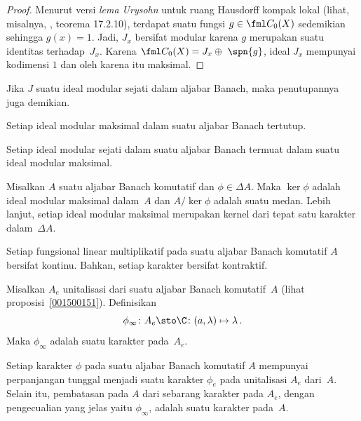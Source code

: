 \begin{proof} Menurut versi \emph{lema Urysohn} untuk ruang Hausdorff kompak lokal
(lihat, misalnya, \cite{Erdman:2007}, teorema 17.2.10), terdapat suatu fungsi $g \in
\fml C_0(X)$ sedemikian sehingga $g(x) = 1$. Jadi, $J_x$ bersifat modular karena $g$
merupakan suatu identitas terhadap~$J_x$. Karena $\fml C_0(X) = J_x \oplus\,\, \spn\{g\}$,
ideal $J_x$ mempunyai kodimensi $1$ dan oleh karena itu maksimal.
\end{proof}

\begin{prop} Jika $J$ suatu ideal modular sejati dalam aljabar Banach, maka penutupannya
juga demikian.
\end{prop}

\begin{cor} Setiap ideal modular maksimal dalam suatu aljabar Banach tertutup.
\end{cor}

\begin{prop} Setiap ideal modular sejati dalam suatu aljabar Banach termuat dalam suatu
ideal modular maksimal.
\end{prop}

\begin{prop}\label{00150144} Misalkan $A$ suatu aljabar Banach komutatif dan $\phi \in
\Delta A$. Maka $\ker\phi$ adalah ideal modular maksimal dalam~$A$ dan $A/\ker\phi$ adalah
suatu medan. Lebih lanjut, setiap ideal modular maksimal merupakan kernel dari tepat satu
karakter dalam~$\Delta A$.
\end{prop}

\begin{prop}\label{00150147} Setiap fungsional linear multiplikatif pada suatu aljabar
Banach komutatif $A$ bersifat kontinu. Bahkan, setiap karakter bersifat kontraktif.
\end{prop}

\begin{exam} Misalkan $A_e$ unitalisasi dari suatu aljabar Banach komutatif~$A$ (lihat
proposisi~\ref{001500151}).
Definisikan
   \[ \phi_\infty\colon A_e \sto \C\colon (a,\lambda) \mapsto \lambda\,. \]
Maka $\phi_\infty$ adalah suatu karakter pada~$A_e$.
\end{exam}

\begin{prop}\label{00150154} Setiap karakter $\phi$ pada suatu aljabar Banach komutatif
$A$ mempunyai perpanjangan tunggal menjadi suatu
karakter $\phi_e$ pada unitalisasi $A_e$ dari~$A$. Selain itu, pembatasan pada $A$ dari sebarang
karakter pada $A_e$, dengan pengecualian yang jelas yaitu $\phi_\infty$, adalah suatu
karakter pada~$A$.
\end{prop}

